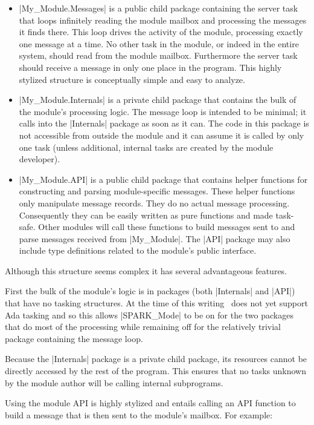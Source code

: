 \begin{itemize}
\item |My_Module.Messages| is a public child package containing the server task that loops
  infinitely reading the module mailbox and processing the messages it finds there. This loop
  drives the activity of the module, processing exactly one message at a time. No other task in
  the module, or indeed in the entire system, should read from the module mailbox. Furthermore
  the server task should receive a message in only one place in the program. This highly
  stylized structure is conceptually simple and easy to analyze.

\item |My_Module.Internals| is a private child package that contains the bulk of the module's
  processing logic. The message loop is intended to be minimal; it calls into the |Internals|
  package as soon as it can. The code in this package is not accessible from outside the module
  and it can assume it is called by only one task (unless additional, internal tasks are created
  by the module developer).

\item |My_Module.API| is a public child package that contains helper functions for constructing
  and parsing module-specific messages. These helper functions only manipulate message records.
  They do no actual message processing. Consequently they can be easily written as pure
  functions and made task-safe. Other modules will call these functions to build messages sent
  to and parse messages received from |My_Module|. The |API| package may also include type
  definitions related to the module's public interface.
\end{itemize}

Although this structure seems complex it has several advantageous features.

First the bulk of the module's logic is in packages (both |Internals| and |API|) that have no
tasking structures. At the time of this writing \SPARK\ does not yet support Ada tasking and so
this allows |SPARK_Mode| to be on for the two packages that do most of the processing while
remaining off for the relatively trivial package containing the message loop.

Because the |Internals| package is a private child package, its resources cannot be directly
accessed by the rest of the program. This ensures that no tasks unknown by the module author
will be calling internal subprograms.

Using the module API is highly stylized and entails calling an API function to build a message
that is then sent to the module's mailbox. For example:

